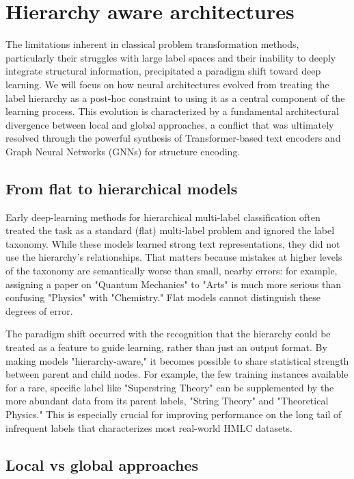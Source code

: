 \chapter{Hierarchy aware architectures}
The limitations inherent in classical problem transformation methods, particularly their struggles with large label spaces and their inability to deeply integrate structural information, precipitated a paradigm shift toward deep learning.
We will focus on how neural architectures evolved from treating the label hierarchy as a post-hoc constraint to using it as a central component of the learning process.
This evolution is characterized by a fundamental architectural divergence between local and global approaches, a conflict that was ultimately resolved through the powerful synthesis of Transformer-based text encoders and Graph Neural Networks (GNNs) for structure encoding.

\section{From flat to hierarchical models}
Early deep-learning methods for hierarchical multi-label classification often treated the task as a standard (flat) multi-label problem and ignored the label taxonomy. While these models learned strong text representations, they did not use the hierarchy's relationships. That matters because mistakes at higher levels of the taxonomy are semantically worse than small, nearby errors: for example, assigning a paper on "Quantum Mechanics" to "Arts" is much more serious than confusing "Physics" with "Chemistry." Flat models cannot distinguish these degrees of error.~\cite{xu-etal-2021-hierarchical}

The paradigm shift occurred with the recognition that the hierarchy could be treated as a feature to guide learning, rather than just an output format. By making models "hierarchy-aware," it becomes possible to share statistical strength between parent and child nodes. For example, the few training instances available for a rare, specific label like "Superstring Theory" can be supplemented by the more abundant data from its parent labels, "String Theory" and "Theoretical Physics." This is especially crucial for improving performance on the long tail of infrequent labels that characterizes most real-world HMLC datasets.~\cite{Zangari2024}

\section{Local vs global approaches}


